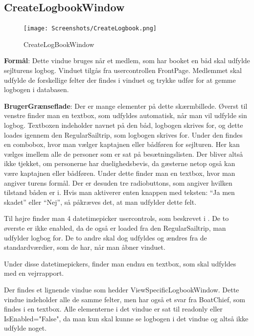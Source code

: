 \subsection{CreateLogbookWindow}

\begin{figure}
    \vspace{-20pt}
    \begin{center}
        \texttt{[image: Screenshots/CreateLogbook.png]}
    \end{center}
    \vspace{-15pt}
    \caption{CreateLogBookWindow}
    \vspace{-30pt}
\end{figure}

\textbf{Formål}: Dette vindue bruges når et medlem, som har booket en båd skal udfylde sejlturens logbog. Vinduet tilgås fra usercontrollen FrontPage. Medlemmet skal udfylde de forskellige felter der findes i vinduet og trykke udfør for at gemme logbogen i databasen.

\textbf{BrugerGrænseflade}: Der er mange elementer på dette skærmbillede. Øverst til venstre finder man en textbox, som udfyldes automatisk, når man vil udfylde sin logbog. 
Textboxen indeholder navnet på den båd, logbogen skrives for, og dette loades igennem den RegularSailtrip, som logbogen skrives for.
Under den findes en combobox, hvor man vælger kaptajnen eller bådføren for sejlturen.
Her kan vælges imellem alle de personer som er sat på besætningslisten. 
Der bliver altså ikke tjekket, om personerne har duelighedsbevis, da gæsterne netop også kan være kaptajnen eller bådføren.
Under dette finder man en textbox, hvor man angiver turens formål. 
Der er desuden tre radiobuttons, som angiver hvilken tilstand båden er i. 
Hvis man aktiverer enten knappen med teksten: ``Ja men skadet'' eller ``Nej'', så påkræves det, at man udfylder dette felt. 

Til højre finder man 4 datetimepicker usercontrols, som beskrevet i . De to øverste er ikke enabled, da de også er loaded fra den RegularSailtrip, man udfylder logbog for. De to andre skal dog udfyldes og ændres fra de standardværdier, som de har, når man åbner vinduet. 

Under disse datetimepickers, finder man endnu en textbox, som skal udfyldes med en vejrrapport.

Der findes et lignende vindue som hedder ViewSpecificLogbookWindow.
Dette vindue indeholder alle de samme felter, men har også et svar fra BoatChief, som findes i en textbox.
Alle elementerne i det vindue er sat til readonly eller IsEnabled="False", da man kun skal kunne se logbogen i det vindue og altså ikke udfylde noget.


